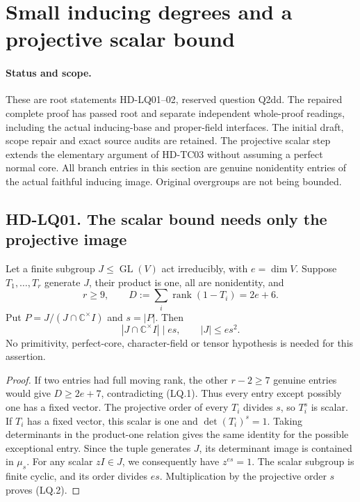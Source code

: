 \section{Small inducing degrees and a projective scalar bound}
\label{sec:low-degree-projective-order}

\paragraph{Status and scope.}
These are root statements HD-LQ01--02, reserved question Q2dd.
The repaired complete proof has passed root and separate independent
whole-proof readings, including the actual inducing-base and proper-field
interfaces. The initial draft, scope repair and exact source audits are retained. The projective scalar step extends the elementary
argument of HD-TC03 without assuming a perfect normal core.
All branch entries in this section are genuine nonidentity entries
of the actual faithful inducing image. Original overgroups are not
being bounded.

\subsection*{HD-LQ01. The scalar bound needs only the projective image}

\begin{lemma}[HD-LQ01]
Let a finite subgroup \(J\le\operatorname{GL}(V)\) act irreducibly,
with \(e=\dim V\). Suppose \(T_1,\ldots,T_r\) generate \(J\),
their product is one, all are nonidentity, and
\[
 r\ge9,\qquad
 D:=\sum_i\operatorname{rank}(1-T_i)=2e+6.
 \tag{LQ.1}
\]
Put \(P=J/(J\cap\mathbb C^\times I)\) and \(s=|P|\).
Then
\[
 |J\cap\mathbb C^\times I|\mid es,
 \qquad |J|\le es^2.
 \tag{LQ.2}
\]
No primitivity, perfect-core, character-field or tensor hypothesis
is needed for this assertion.
\end{lemma}

\begin{proof}
If two entries had full moving rank, the other \(r-2\ge7\)
genuine entries would give
\(D\ge2e+7\), contradicting (LQ.1).
Thus every entry except possibly one has a fixed vector.
The projective order of every \(T_i\) divides \(s\), so
\(T_i^s\) is scalar. If \(T_i\) has a fixed vector, this scalar
is one and \(\det(T_i)^s=1\).
Taking determinants in the product-one relation gives the same
identity for the possible exceptional entry. Since the tuple
generates \(J\), its determinant image is contained in \(\mu_s\).
For any scalar \(zI\in J\), we consequently have \(z^{es}=1\).
The scalar subgroup is finite cyclic, and its order divides \(es\).
Multiplication by the projective order \(s\) proves (LQ.2).
\end{proof}

